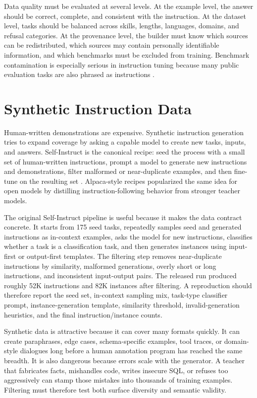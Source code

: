 Data quality must be evaluated at several levels. At the example level, the answer should be correct, complete, and consistent with the instruction. At the dataset level, tasks should be balanced across skills, lengths, languages, domains, and refusal categories. At the provenance level, the builder must know which sources can be redistributed, which sources may contain personally identifiable information, and which benchmarks must be excluded from training. Benchmark contamination is especially serious in instruction tuning because many public evaluation tasks are also phrased as instructions \cite{shi2023detecting,xu2024benchmark}.

\section{Synthetic Instruction Data}
\label{sec:synthetic-instruction-data}

Human-written demonstrations are expensive. Synthetic instruction generation tries to expand coverage by asking a capable model to create new tasks, inputs, and answers. Self-Instruct is the canonical recipe: seed the process with a small set of human-written instructions, prompt a model to generate new instructions and demonstrations, filter malformed or near-duplicate examples, and then fine-tune on the resulting set \cite{wang2022selfinstruct}. Alpaca-style recipes popularized the same idea for open models by distilling instruction-following behavior from stronger teacher models.

The original Self-Instruct pipeline is useful because it makes the data contract concrete. It starts from 175 seed tasks, repeatedly samples seed and generated instructions as in-context examples, asks the model for new instructions, classifies whether a task is a classification task, and then generates instances using input-first or output-first templates. The filtering step removes near-duplicate instructions by similarity, malformed generations, overly short or long instructions, and inconsistent input-output pairs. The released run produced roughly 52K instructions and 82K instances after filtering. A reproduction should therefore report the seed set, in-context sampling mix, task-type classifier prompt, instance-generation template, similarity threshold, invalid-generation heuristics, and the final instruction/instance counts.

Synthetic data is attractive because it can cover many formats quickly. It can create paraphrases, edge cases, schema-specific examples, tool traces, or domain-style dialogues long before a human annotation program has reached the same breadth. It is also dangerous because errors scale with the generator. A teacher that fabricates facts, mishandles code, writes insecure SQL, or refuses too aggressively can stamp those mistakes into thousands of training examples. Filtering must therefore test both surface diversity and semantic validity.


